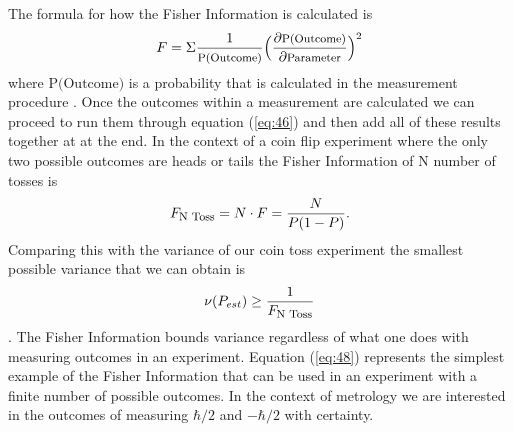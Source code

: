 \documentclass[twocolumn]{article}
\begin{document}
The formula for how the Fisher Information is calculated is 
\begin{equation} \label{eq:46}
F=\Sigma\frac{1}{\text{\footnotesize{P(Outcome)}}}\Big(\frac{\partial \text{\footnotesize{P(Outcome)}}}{\partial\text{\footnotesize{Parameter}}}\Big)^2
\end{equation}
where $\text{P(Outcome)}$ is a probability that is calculated in the measurement procedure \cite{Paris}. Once the outcomes within a measurement are calculated we can proceed to run them through equation (\ref{eq:46}) and then add all of these results together at at the end. In the context of a coin flip experiment where the only two possible outcomes are heads or tails the Fisher Information of N number of tosses is
\begin{equation} \label{eq:47}
F_{\text{\footnotesize{N Toss}}}=N\cdot F=\frac{N}{P(1-P)}.
\end{equation}
Comparing this with the variance of our coin toss experiment the smallest possible variance that we can obtain is
\begin{equation} \label{eq:48}
\nu(P_{est})\geq\frac{1}{F_{\text{\footnotesize{N Toss}}}}
\end{equation}
\cite{D. Collins}. The Fisher Information bounds variance regardless of what one does with measuring outcomes in an experiment. Equation (\ref{eq:48}) represents the simplest example of the Fisher Information that can be used in an experiment with a finite number of possible outcomes. In the context of metrology we are interested in the outcomes of measuring $\hbar/2$ and $-\hbar/2$ with certainty.
\end{document}
